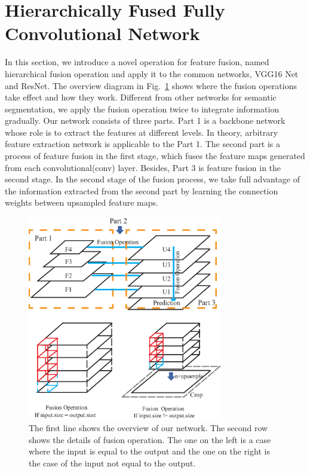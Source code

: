 \section{Hierarchically Fused Fully Convolutional Network}
\label{Sec:HF-FCN}
In this section, we introduce a novel operation for feature fusion, named hierarchical fusion operation and apply it to the common networks, VGG16 Net and ResNet. The overview diagram in Fig.~\ref{fig:Fusion-Operation} shows where the fusion operations take effect and how they work. Different from other networks for semantic segmentation, we apply the fusion operation twice to integrate information gradually.
Our network consists of three parts. Part 1 is a backbone network whose role is to extract the features at different levels.
In theory, arbitrary feature extraction network is applicable to the Part 1.
The second part is a process of feature fusion in the first stage, which fuses the feature maps generated from each convolutional(conv) layer.
Besides, Part 3 is feature fusion in the second stage.
In the second stage of the fusion process, we take full advantage of the information extracted from the second part by learning the connection weights between upsampled feature maps.

\begin{figure}
\centering
\includegraphics[width=8.5cm]{Figures/Fusion_Operation.eps}
\caption{The first line shows the overview of our network. The second row shows the details of fusion operation. The one on the left is a case where the input is equal to the output and the one on the right is the case of the input not equal to the output.}
\label{fig:Fusion-Operation}
\end{figure}
